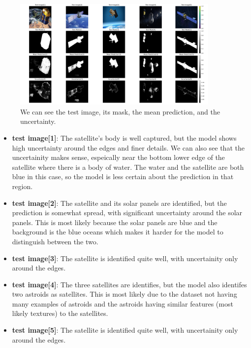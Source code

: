 \documentclass{article}
\begin{document}
\begin{figure}[h]
    \centering
    \includegraphics[width=0.9\textwidth]{../images/MC_dropout/test_image[0-5].png}
    \caption{We can see the test image, its mask, the mean prediction, and the uncertainty.}
    \label{fig:mc_dropout_single_image}
\end{figure}
\vspace{1em}

\begin{itemize}
    \item \textbf{test image[1]}: The satellite's body is well captured, but the model shows high uncertainty around the 
    edges and finer details. We can also see that the uncertainity makes sense, espeically near the bottom lower edge of 
    the satellite where there is a body of water. The water and the satellite are both blue in this case, so the model is 
    less certain about the prediction in that region.
    \item \textbf{test image[2]}: The satellite and its solar panels are identified, but the prediction is somewhat 
    spread, with significant uncertainty around the solar panels. This is most likely because the solar panels are blue 
    and the background is the blue oceans which makes it harder for the model to distinguish between the two.
    \item \textbf{test image[3]}: The satellite is identified quite well, with uncertainity only around the edges.
    \item \textbf{test image[4]}: The three satellites are identifies, but the model also identifes two astroids as satellites. 
    This is most likely due to the dataset not having many examples of astroids and the astroids having similar features 
    (most likely textures) to the satellites.
    \item \textbf{test image[5]}: The satellite is identified quite well, with uncertainity only around the edges.
\end{itemize}
\vspace{1em}
\end{document}
